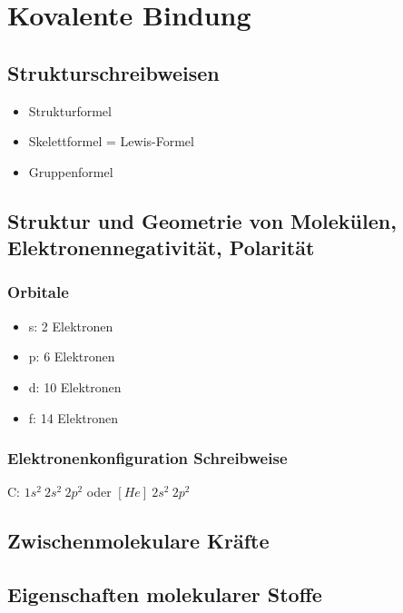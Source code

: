 \section{Kovalente Bindung}

\subsection{Strukturschreibweisen}

\begin{itemize}
	\item Strukturformel
	\item Skelettformel = Lewis-Formel
	\item Gruppenformel
\end{itemize}

\subsection{Struktur und Geometrie von Molekülen, Elektronennegativität, Polarität}

\subsubsection{Orbitale}

\begin{itemize}
	\item s: 2 Elektronen
	\item p: 6 Elektronen
	\item d: 10 Elektronen
	\item f: 14 Elektronen
\end{itemize}

\subsubsection{Elektronenkonfiguration Schreibweise}

C: $1s^2 \ 2s^2 \ 2p^2$ oder $[He] \ 2s^2 \ 2p^2$

\subsection{Zwischenmolekulare Kräfte}

\subsection{Eigenschaften molekularer Stoffe}